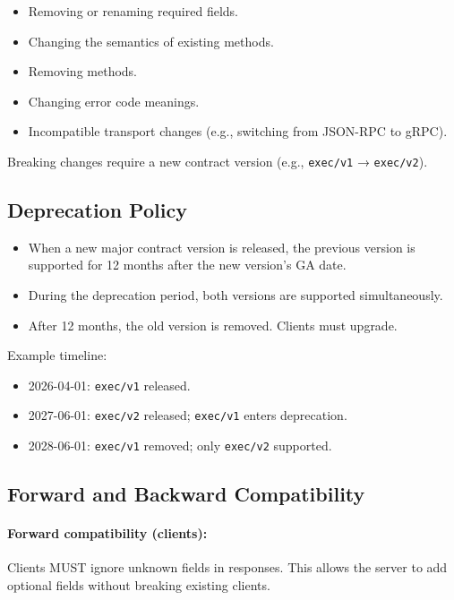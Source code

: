 \begin{itemize}
  \item Removing or renaming required fields.
  \item Changing the semantics of existing methods.
  \item Removing methods.
  \item Changing error code meanings.
  \item Incompatible transport changes (e.g., switching from JSON-RPC to gRPC).
\end{itemize}

Breaking changes require a new contract version (e.g., \texttt{exec/v1} →
\texttt{exec/v2}).

\subsection{Deprecation Policy}

\begin{itemize}
  \item When a new major contract version is released, the previous version is
        supported for 12 months after the new version's GA date.
  \item During the deprecation period, both versions are supported
        simultaneously.
  \item After 12 months, the old version is removed.  Clients must upgrade.
\end{itemize}

Example timeline:

\begin{itemize}
  \item 2026-04-01: \texttt{exec/v1} released.
  \item 2027-06-01: \texttt{exec/v2} released; \texttt{exec/v1} enters
        deprecation.
  \item 2028-06-01: \texttt{exec/v1} removed; only \texttt{exec/v2} supported.
\end{itemize}

\subsection{Forward and Backward Compatibility}

\paragraph{Forward compatibility (clients):}

Clients MUST ignore unknown fields in responses.  This allows the server to add
optional fields without breaking existing clients.

